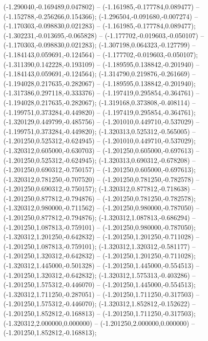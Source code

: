  (-1.290040,-0.169489,0.047802) -- (-1.161985,-0.177784,0.089477) -- (-1.152788,-0.256266,0.154366);
 (-1.296504,-0.091680,-0.007274) -- (-1.170303,-0.098830,0.021283) -- (-1.161985,-0.177784,0.089477);
 (-1.302231,-0.013695,-0.065828) -- (-1.177702,-0.019603,-0.050107) -- (-1.170303,-0.098830,0.021283);
 (-1.307198,0.064323,-0.127799) -- (-1.184143,0.059691,-0.124564) -- (-1.177702,-0.019603,-0.050107);
 (-1.311390,0.142228,-0.193109) -- (-1.189595,0.138842,-0.201940) -- (-1.184143,0.059691,-0.124564);
 (-1.314790,0.219876,-0.261669) -- (-1.194028,0.217635,-0.282067) -- (-1.189595,0.138842,-0.201940);
 (-1.317386,0.297118,-0.333376) -- (-1.197419,0.295854,-0.364761) -- (-1.194028,0.217635,-0.282067);
 (-1.319168,0.373808,-0.408114) -- (-1.199751,0.373284,-0.449820) -- (-1.197419,0.295854,-0.364761);
 (-1.320129,0.449799,-0.485756) -- (-1.201010,0.449710,-0.537029) -- (-1.199751,0.373284,-0.449820);
 (-1.320313,0.525312,-0.565005) -- (-1.201250,0.525312,-0.624945) -- (-1.201010,0.449710,-0.537029);
 (-1.320312,0.605000,-0.630703) -- (-1.201250,0.605000,-0.697613) -- (-1.201250,0.525312,-0.624945);
 (-1.320313,0.690312,-0.678208) -- (-1.201250,0.690312,-0.750157) -- (-1.201250,0.605000,-0.697613);
 (-1.320312,0.781250,-0.707520) -- (-1.201250,0.781250,-0.782578) -- (-1.201250,0.690312,-0.750157);
 (-1.320312,0.877812,-0.718638) -- (-1.201250,0.877812,-0.794876) -- (-1.201250,0.781250,-0.782578);
 (-1.320312,0.980000,-0.711562) -- (-1.201250,0.980000,-0.787050) -- (-1.201250,0.877812,-0.794876);
 (-1.320312,1.087813,-0.686294) -- (-1.201250,1.087813,-0.759101) -- (-1.201250,0.980000,-0.787050);
 (-1.320312,1.201250,-0.642832) -- (-1.201250,1.201250,-0.711028) -- (-1.201250,1.087813,-0.759101);
 (-1.320312,1.320312,-0.581177) -- (-1.201250,1.320312,-0.642832) -- (-1.201250,1.201250,-0.711028);
 (-1.320312,1.445000,-0.501328) -- (-1.201250,1.445000,-0.554513) -- (-1.201250,1.320312,-0.642832);
 (-1.320312,1.575313,-0.403286) -- (-1.201250,1.575312,-0.446070) -- (-1.201250,1.445000,-0.554513);
 (-1.320312,1.711250,-0.287051) -- (-1.201250,1.711250,-0.317503) -- (-1.201250,1.575312,-0.446070);
 (-1.320312,1.852812,-0.152622) -- (-1.201250,1.852812,-0.168813) -- (-1.201250,1.711250,-0.317503);
 (-1.320312,2.000000,0.000000) -- (-1.201250,2.000000,0.000000) -- (-1.201250,1.852812,-0.168813);
